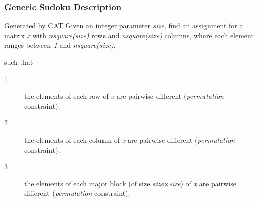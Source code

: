 \begin{frame}
\frametitle{Generic Sudoku Description}
\begin{block}{Generated by CAT}
Given an integer parameter \emph{size}, 
find an assignment for a matrix \emph{x} with \emph{nsquare(size)} rows and \emph{nsquare(size)} columns, where each element ranges between \emph{1} and \emph{nsquare(size)},

\noindent such that
\begin{description}
\item[1] the elements of each row of \emph{x} are pairwise different (\emph{permutation} constraint).


\item[2] the elements of each column of \emph{x} are pairwise different (\emph{permutation} constraint).


\item[3] the elements of each major block (of size \emph{size}$\times$\emph{size}) of \emph{x} are pairwise different (\emph{permutation} constraint).


\end{description}
\end{block}
\end{frame}
